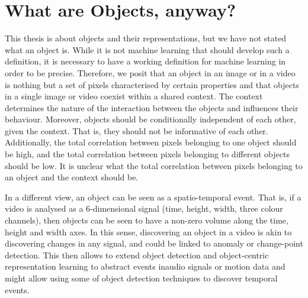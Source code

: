 \section{What are Objects, anyway?}
\label{sec:what_are_objects}
This thesis is about objects and their representations, but we have not stated what an object is. 
While it is not machine learning that should develop such a definition, it is necessary to have a working definition for machine learning in order to be precise.
Therefore, we posit that an object in an image or in a video is nothing but a set of pixels characterised by certain properties and that objects in a single image or video coexist within a shared context.
The context determines the nature of the interaction between the objects and influences their behaviour.
Moreover, objects should be conditionally independent of each other, given the context.
That is, they should not be informative of each other.
Additionally, the total correlation between pixels belonging to one object should be high, and the total correlation between pixels belonging to different objects should be low.
It is unclear what the total correlation between pixels belonging to an object and the context should be.

In a different view, an object can be seen as a spatio-temporal event.
That is, if a video is analysed as a 6-dimensional signal (time, height, width, three colour channels), then objects can be seen to have a non-zero volume along the time, height and width axes.
In this sense, discovering an object in a video is akin to discovering changes in any signal, and could be linked to anomaly or change-point detection.
This then allows to extend object detection and object-centric representation learning to abstract events in\eg audio signals or motion data and might allow using some of object detection techniques to discover temporal events.